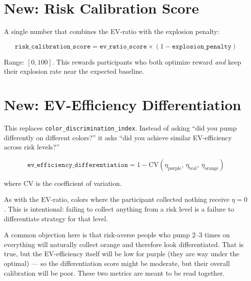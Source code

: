\documentclass[11pt,a4paper]{article}
\begin{document}
\section{New: Risk Calibration Score}

A single number that combines the EV-ratio with the explosion penalty:

\begin{equation}
    \texttt{risk\_calibration\_score} = \texttt{ev\_ratio\_score} \times
        (1 - \texttt{explosion\_penalty})
\end{equation}

Range: $[0, 100]$. This rewards participants who both optimize reward
\emph{and} keep their explosion rate near the expected baseline.


\section{New: EV-Efficiency Differentiation}
\label{sec:ev_diff}

This replaces \texttt{color\_discrimination\_index}. Instead of asking
``did you pump differently on different colors?'' it asks ``did you achieve
similar EV-efficiency across risk levels?''

\begin{equation}
    \texttt{ev\_efficiency\_differentiation} = 1 - \text{CV}(\eta_{\text{purple}},\,
        \eta_{\text{teal}},\, \eta_{\text{orange}})
\end{equation}

where $\text{CV}$ is the coefficient of variation.

As with the EV-ratio, colors where the participant collected nothing receive
$\eta = 0$. This is intentional: failing to collect anything from a risk
level is a failure to differentiate strategy for that level.

A common objection here is that risk-averse people who pump 2--3 times on
everything will naturally collect orange and therefore look differentiated.
That is true, but the EV-efficiency itself will be low for purple (they are
way under the optimal) --- so the differentiation score might be moderate,
but their overall calibration will be poor. These two metrics are meant to
be read together.
\end{document}
